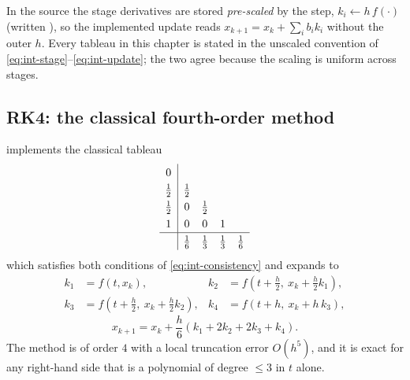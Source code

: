 \begin{lupntnote}
  In the \lupnt{} source the stage derivatives are stored \emph{pre-scaled} by
  the step, $k_i \leftarrow h\, f(\cdot)$ (written ), so the
  implemented update reads $x_{k+1} = x_k + \sum_i b_i k_i$ without the outer
  $h$. Every tableau in this chapter is stated in the unscaled convention of
  \cref{eq:int-stage}--\cref{eq:int-update}; the two agree because the scaling
  is uniform across stages.
\end{lupntnote}

\subsection{RK4: the classical fourth-order method}
\label{sec:int-rk4}

 implements the classical tableau
\begin{equation}
  \label{eq:int-rk4-tableau}
  \renewcommand{\arraystretch}{1.3}
  \begin{array}{c|cccc}
    0            &             &             &             &             \\
    \tfrac{1}{2} & \tfrac{1}{2}&             &             &             \\
    \tfrac{1}{2} & 0           & \tfrac{1}{2}&             &             \\
    1            & 0           & 0           & 1           &             \\
    \hline
                 & \tfrac{1}{6}& \tfrac{1}{3}& \tfrac{1}{3}& \tfrac{1}{6}
  \end{array}
\end{equation}
which satisfies both conditions of \cref{eq:int-consistency} and expands to
\begin{align}
  \label{eq:int-rk4-stages}
  k_1 &= f(t, x_k), &
  k_2 &= f\!\left(t+\tfrac{h}{2},\ x_k + \tfrac{h}{2}k_1\right), \nonumber \\
  k_3 &= f\!\left(t+\tfrac{h}{2},\ x_k + \tfrac{h}{2}k_2\right), &
  k_4 &= f\!\left(t+h,\ x_k + h\,k_3\right),
\end{align}
\begin{equation}
  \label{eq:int-rk4-update}
  x_{k+1} = x_k + \frac{h}{6}\left(k_1 + 2k_2 + 2k_3 + k_4\right).
\end{equation}
The method is of order $4$ with a local truncation error $O(h^5)$, and it is
exact for any right-hand side that is a polynomial of degree $\le 3$ in $t$
alone.

